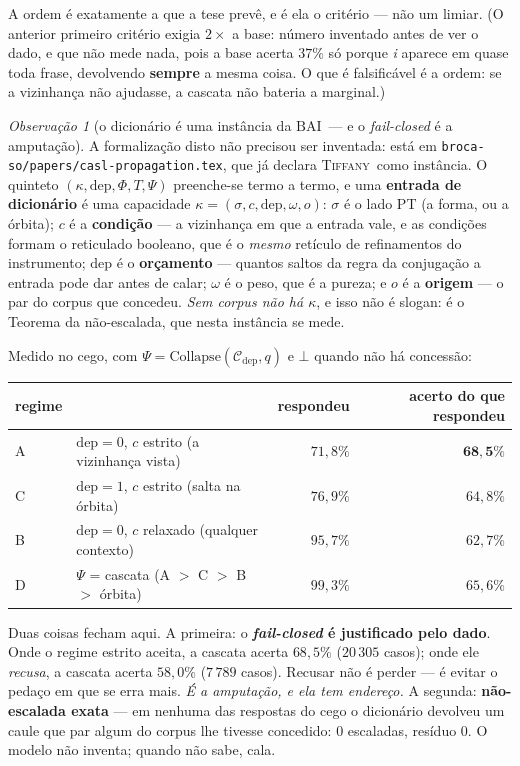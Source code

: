 \documentclass[11pt]{article}
\newcommand{\code}[1]{\texttt{\small #1}}
\theoremstyle{plain}
\theoremstyle{remark}
\newtheorem{obs}{Observação}
\providecommand{\Tiffany}{\textsc{Tiffany}}
\providecommand{\BAI}{\ensuremath{\mathrm{BAI}}}
\providecommand{\CalC}{\ensuremath{\mathcal{C}}}
\providecommand{\Collapse}{\ensuremath{\mathrm{Collapse}}}
\providecommand{\dep}{\ensuremath{\mathrm{dep}}}
\begin{document}
\noindent A ordem é exatamente a que a tese prevê, e é ela o critério --- não um limiar. (O anterior primeiro
critério exigia $2\times$ a base: número inventado antes de ver o dado, e que não mede nada, pois a base
acerta $37\%$ só porque \emph{i} aparece em quase toda frase, devolvendo \textbf{sempre} a mesma coisa.
O que é falsificável é a ordem: se a vizinhança não ajudasse, a cascata não bateria a marginal.)

\begin{obs}[o dicionário é uma instância da \BAI\ --- e o \emph{fail-closed} é a amputação]\label{obs:bai}
A formalização disto não precisou ser inventada: está em \code{broca-so/papers/casl-propagation.tex},
que já declara \Tiffany\ como instância. O quinteto $(\kappa,\dep,\Phi,T,\Psi)$ preenche-se termo a termo,
e uma \textbf{entrada de dicionário} é uma capacidade $\kappa=(\sigma,c,\dep,\omega,o)$: $\sigma$ é o lado
PT (a forma, ou a órbita); $c$ é a \textbf{condição} --- a vizinhança em que a entrada vale, e as condições
formam o reticulado booleano, que é o \emph{mesmo} retículo de refinamentos do instrumento; $\dep$ é o
\textbf{orçamento} --- quantos saltos da regra da conjugação a entrada pode dar antes de calar; $\omega$ é
o peso, que é a pureza; e $o$ é a \textbf{origem} --- o par do corpus que concedeu. \emph{Sem corpus não
há $\kappa$}, e isso não é slogan: é o Teorema da não-escalada, que nesta instância se mede.

Medido no cego, com $\Psi=\Collapse(\CalC_\dep,q)$ e $\bot$ quando não há concessão:

\begin{center}\small
\begin{tabular}{llrr}
\toprule
regime & & respondeu & acerto do que respondeu \\
\midrule
A & $\dep=0$, $c$ estrito (a vizinhança vista) & $71{,}8\%$ & $\mathbf{68{,}5\%}$ \\
C & $\dep=1$, $c$ estrito (salta na órbita) & $76{,}9\%$ & $64{,}8\%$ \\
B & $\dep=0$, $c$ relaxado (qualquer contexto) & $95{,}7\%$ & $62{,}7\%$ \\
D & $\Psi$ = cascata (A $>$ C $>$ B $>$ órbita)& $99{,}3\%$ & $65{,}6\%$ \\
\bottomrule
\end{tabular}
\end{center}

\noindent Duas coisas fecham aqui. A primeira: o \textbf{\emph{fail-closed} é justificado pelo dado}. Onde
o regime estrito aceita, a cascata acerta $68{,}5\%$ ($20\,305$ casos); onde ele \emph{recusa}, a cascata
acerta $58{,}0\%$ ($7\,789$ casos). Recusar não é perder --- é evitar o pedaço em que se erra mais.
\emph{É a amputação, e ela tem endereço.} A segunda: \textbf{não-escalada exata} --- em nenhuma das
respostas do cego o dicionário devolveu um caule que par algum do corpus lhe tivesse concedido:
$0$ escaladas, resíduo $0$. O modelo não inventa; quando não sabe, cala.


\end{obs}
\end{document}
